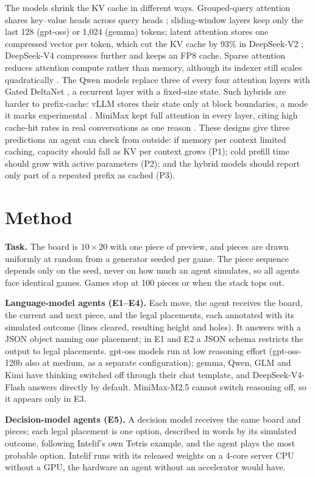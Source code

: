 \documentclass{article}
\begin{document}
The models shrink the KV cache in different ways. Grouped-query attention shares key--value heads across query heads \citep{gqa}; sliding-window layers keep only the last 128 (gpt-oss) or 1,024 (gemma) tokens; latent attention stores one compressed vector per token, which cut the KV cache by 93\% in DeepSeek-V2 \citep{dsv2}; DeepSeek-V4 compresses further and keeps an FP8 cache. Sparse attention reduces attention compute rather than memory, although its indexer still scales quadratically \citep{dsv32,indexcache}. The Qwen models replace three of every four attention layers with Gated DeltaNet \citep{gdn}, a recurrent layer with a fixed-size state. Such hybrids are harder to prefix-cache: vLLM stores their state only at block boundaries, a mode it marks experimental \citep{vllmhybrid}. MiniMax kept full attention in every layer, citing high cache-hit rates in real conversations as one reason \citep{minimax}. These designs give three predictions an agent can check from outside: if memory per context limited caching, capacity should fall as KV per context grows (P1); cold prefill time should grow with active parameters (P2); and the hybrid models should report only part of a repeated prefix as cached (P3).

\section{Method}
\label{sec:method}

\textbf{Task.} The board is $10\times20$ with one piece of preview, and pieces are drawn uniformly at random from a generator seeded per game. The piece sequence depends only on the seed, never on how much an agent simulates, so all agents face identical games. Games stop at 100 pieces or when the stack tops out.

\textbf{Language-model agents (E1--E4).} Each move, the agent receives the board, the current and next piece, and the legal placements, each annotated with its simulated outcome (lines cleared, resulting height and holes). It answers with a JSON object naming one placement; in E1 and E2 a JSON schema restricts the output to legal placements. gpt-oss models run at low reasoning effort (gpt-oss-120b also at medium, as a separate configuration); gemma, Qwen, GLM and Kimi have thinking switched off through their chat template, and DeepSeek-V4-Flash answers directly by default. MiniMax-M2.5 cannot switch reasoning off, so it appears only in E3.

\textbf{Decision-model agents (E5).} A decision model receives the same board and pieces; each legal placement is one option, described in words by its simulated outcome, following Intelif's own Tetris example, and the agent plays the most probable option. Intelif runs with its released weights on a 4-core server CPU without a GPU, the hardware an agent without an accelerator would have.
\end{document}
